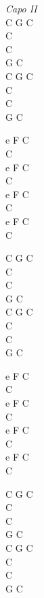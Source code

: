 \begin{chord}
    \textit{Capo II}\\
    C G C\\
    C\\
    C\\
    G C\\
    C G C\\
    C\\
    C\\
    G C

    e F C\\
    C\\
    e F C\\
    C\\
    e F C\\
    C\\
    e F C\\
    C

    C G C\\
    C\\
    C\\
    G C\\
    C G C\\
    C\\
    C\\
    G C

    e F C\\
    C\\
    e F C\\
    C\\
    e F C\\
    C\\
    e F C\\
    C

    C G C\\
    C\\
    C\\
    G C\\
    C G C\\
    C\\
    C\\
    G C
    \end{chord}
\vfill
